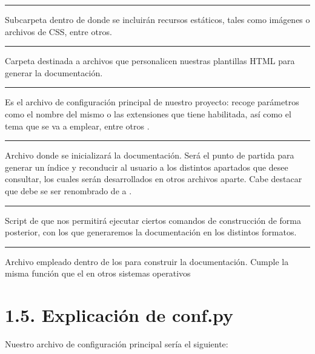 \documentclass[a4paper,10pt,spanish]{sphinxmanual}
\begin{document}
\bigskip\hrule\bigskip


\sphinxAtStartPar
{} Subcarpeta dentro de  donde se incluirán recursos estáticos, tales como imágenes o archivos de CSS, entre otros.


\bigskip\hrule\bigskip


\sphinxAtStartPar
{} Carpeta destinada a archivos que personalicen nuestras plantillas HTML para generar la documentación.


\bigskip\hrule\bigskip


\sphinxAtStartPar
{} Es el archivo de configuración principal de nuestro proyecto: recoge parámetros como el nombre del mismo o las extensiones que tiene habilitada, así como el tema que se va a emplear, entre otros .


\bigskip\hrule\bigskip


\sphinxAtStartPar
{} Archivo donde se inicializará la documentación. Será el punto de partida para generar un índice y reconducir al usuario a los distintos apartados que desee consultar, los cuales serán desarrollados en otros archivos  aparte. Cabe destacar que debe se ser renombrado de  a .


\bigskip\hrule\bigskip


\sphinxAtStartPar
{} Script de  que nos permitirá ejecutar ciertos comandos de construcción de forma posterior, con los que generaremos la documentación en los distintos formatos.


\bigskip\hrule\bigskip


\sphinxAtStartPar
{} Archivo empleado dentro de los  para construir la documentación. Cumple la misma función que el  en otros sistemas operativos

\sphinxstepscope


\section{1.5. Explicación de conf.py}
\label{\detokenize{1_configuracion_inicial/explicacion_confpy:explicacion-de-conf-py}}\label{\detokenize{1_configuracion_inicial/explicacion_confpy::doc}}
\sphinxAtStartPar
Nuestro archivo de configuración principal sería el siguiente:
\end{document}
